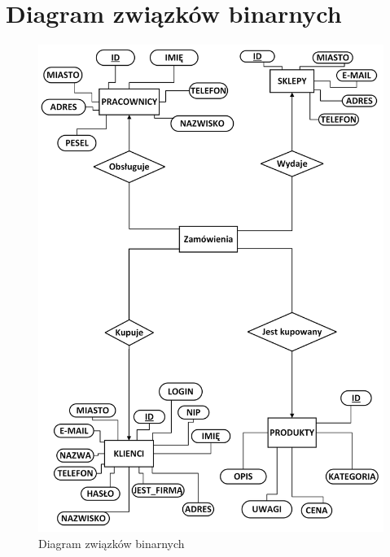 \documentclass[12pt,a4paper]{article}
\begin{document}
    \section{Diagram związków binarnych} 
        \begin{figure}[H]
            \centering
            \includegraphics[width=\textwidth, height = 0.88\textheight]{images/ZwiazekBinarny.png}
            \caption{Diagram związków binarnych}
        \end{figure}
        
\end{document}
